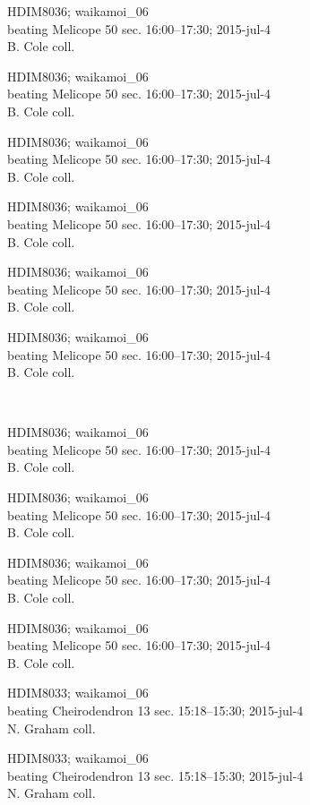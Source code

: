 \documentclass[2pt]{extarticle}
\begin{document}
\noindent
\parbox{0.16\textwidth}{\tiny \raggedright \rule[-0.3\baselineskip]{0pt}{10pt}HDIM8036; waikamoi\_06\\ beating Melicope 50 sec. 16:00--17:30; 2015-jul-4\\ B. Cole coll.}
\parbox{0.16\textwidth}{\tiny \raggedright \rule[-0.3\baselineskip]{0pt}{10pt}HDIM8036; waikamoi\_06\\ beating Melicope 50 sec. 16:00--17:30; 2015-jul-4\\ B. Cole coll.}
\parbox{0.16\textwidth}{\tiny \raggedright \rule[-0.3\baselineskip]{0pt}{10pt}HDIM8036; waikamoi\_06\\ beating Melicope 50 sec. 16:00--17:30; 2015-jul-4\\ B. Cole coll.}
\parbox{0.16\textwidth}{\tiny \raggedright \rule[-0.3\baselineskip]{0pt}{10pt}HDIM8036; waikamoi\_06\\ beating Melicope 50 sec. 16:00--17:30; 2015-jul-4\\ B. Cole coll.}
\parbox{0.16\textwidth}{\tiny \raggedright \rule[-0.3\baselineskip]{0pt}{10pt}HDIM8036; waikamoi\_06\\ beating Melicope 50 sec. 16:00--17:30; 2015-jul-4\\ B. Cole coll.}
\parbox{0.16\textwidth}{\tiny \raggedright \rule[-0.3\baselineskip]{0pt}{10pt}HDIM8036; waikamoi\_06\\ beating Melicope 50 sec. 16:00--17:30; 2015-jul-4\\ B. Cole coll.} \\ 
\vspace{0.001in} 

\noindent
\parbox{0.16\textwidth}{\tiny \raggedright \rule[-0.3\baselineskip]{0pt}{10pt}HDIM8036; waikamoi\_06\\ beating Melicope 50 sec. 16:00--17:30; 2015-jul-4\\ B. Cole coll.}
\parbox{0.16\textwidth}{\tiny \raggedright \rule[-0.3\baselineskip]{0pt}{10pt}HDIM8036; waikamoi\_06\\ beating Melicope 50 sec. 16:00--17:30; 2015-jul-4\\ B. Cole coll.}
\parbox{0.16\textwidth}{\tiny \raggedright \rule[-0.3\baselineskip]{0pt}{10pt}HDIM8036; waikamoi\_06\\ beating Melicope 50 sec. 16:00--17:30; 2015-jul-4\\ B. Cole coll.}
\parbox{0.16\textwidth}{\tiny \raggedright \rule[-0.3\baselineskip]{0pt}{10pt}HDIM8036; waikamoi\_06\\ beating Melicope 50 sec. 16:00--17:30; 2015-jul-4\\ B. Cole coll.}
\parbox{0.16\textwidth}{\tiny \raggedright \rule[-0.3\baselineskip]{0pt}{10pt}HDIM8033; waikamoi\_06\\ beating Cheirodendron 13 sec. 15:18--15:30; 2015-jul-4\\ N. Graham coll.}
\parbox{0.16\textwidth}{\tiny \raggedright \rule[-0.3\baselineskip]{0pt}{10pt}HDIM8033; waikamoi\_06\\ beating Cheirodendron 13 sec. 15:18--15:30; 2015-jul-4\\ N. Graham coll.} \\ 
\vspace{0.001in} 
\end{document}
